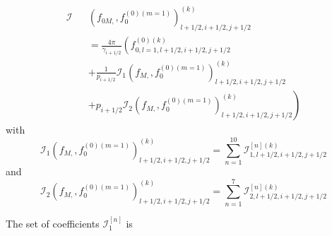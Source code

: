 \begin{eqnarray}
\mathcal{I}&&\left( f_{0M,},f_{0}^{\left( 0\right) \left(
m=1\right) }\right) _{l+1/2,i+1/2,j+1/2}^{\left( k\right) }
\nonumber
\\&&=\frac{4\pi }{\gamma _{i+1/2}} \left(
f_{0,l=1,l+1/2,i+1/2,j+1/2}^{\left( 0\right) \left( k\right)
}\right.
\nonumber \\
&&+\frac{1}{p_{i+1/2}}\mathcal{I}_{1}\left( f_{M,},f_{0}^{\left( 0\right)
\left( m=1\right) }\right) _{l+1/2,i+1/2,j+1/2}^{\left( k\right) }  \nonumber
\\
&&\left. +p_{i+1/2}\mathcal{I}_{2}\left( f_{M,},f_{0}^{\left( 0\right)
\left( m=1\right) }\right) _{l+1/2,i+1/2,j+1/2}^{\left( k\right) }\right)
\end{eqnarray}
with
\begin{equation}
\mathcal{I}_{1}\left( f_{M,},f_{0}^{\left( 0\right) \left( m=1\right)
}\right) _{l+1/2,i+1/2,j+1/2}^{\left( k\right) }=\sum_{n=1}^{10}\mathcal{I}%
_{1,l+1/2,i+1/2,j+1/2}^{\left[ n\right] \left( k\right) }
\end{equation}
and
\begin{equation}
\mathcal{I}_{2}\left( f_{M,},f_{0}^{\left( 0\right) \left( m=1\right)
}\right) _{l+1/2,i+1/2,j+1/2}^{\left( k\right) }=\sum_{n=1}^{7}\mathcal{I}%
_{2,l+1/2,i+1/2,j+1/2}^{\left[ n\right] \left( k\right) }
\end{equation}

The set of coefficients $\mathcal{I}_{1}^{\left[ n\right] }$ is

